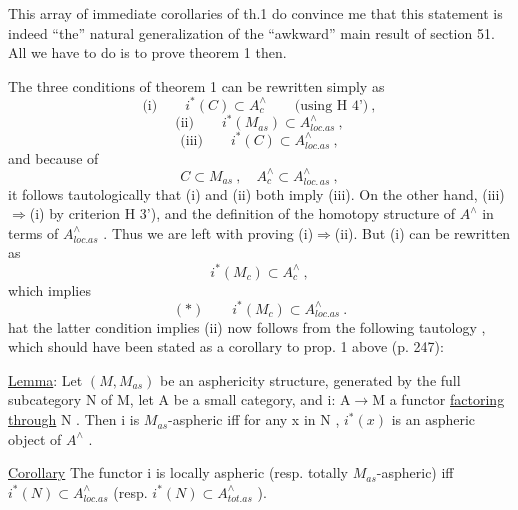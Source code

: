 
This array of immediate corollaries of th.1 do convince me that this
statement is indeed ``the'' natural generalization of the ``awkward'' main
result of section 51. All we have to do is to prove theorem 1 then.

The three conditions of theorem 1 can be rewritten simply as
\[ \text{(i)} \qquad i^{*}(C) \subset A^{\wedge}_{c} \qquad \text{(using H 4')} \ , \]
\[ \text{(ii)} \qquad i^{*}(M_{as}) \subset A^{\wedge}_{loc.as} \ , \]
\[ \text{(iii)} \qquad i^{*}(C) \subset A^{\wedge}_{loc.as} \ , \]
and because of
\[ C \subset M_{as} \ , \quad A^{\wedge}_{c} \subset A^{\wedge}_{loc.\,as} \ , \]
it follows tautologically that (i) and (ii) both imply (iii). On the
other hand, (iii)$\Rightarrow$(i) by criterion H 3'), and the definition of the
homotopy  structure of $A^{\wedge}$ in terms of  $A^{\wedge}_{loc.as}$ . Thus
we are left with proving (i)$\Rightarrow$(ii). But (i) can be rewritten as
\[ i^{*}(M_{c}) \subset A^{\wedge}_{c} \ , \]
which implies
\[ (*) \qquad i^{*}(M_{c}) \subset A^{\wedge}_{loc.as} \ . \]
 hat the latter condition implies (ii)
 now follows from the  following tautology , which should
have been stated as a corollary to prop. 1 above (p. 247):

\uline{Lemma}: Let $(M,M_{as})$ be an asphericity structure, generated by the full
subcategory N of M, let A be a small category, and i: A$\rightarrow$M a functor
\uline{factoring through} N . Then  i is $M_{as}$-aspheric iff for any x in N ,
$i^{*}(x)$ is an aspheric object of $A^{\wedge}$ .

\uline{Corollary} The functor i is locally  aspheric (resp. totally $M_{as}$-aspheric)
iff  $i^{*}(N) \subset A^{\wedge}_{loc.as}$ (resp. $i^{*}(N) \subset A^{\wedge}_{tot.as}$ ).

